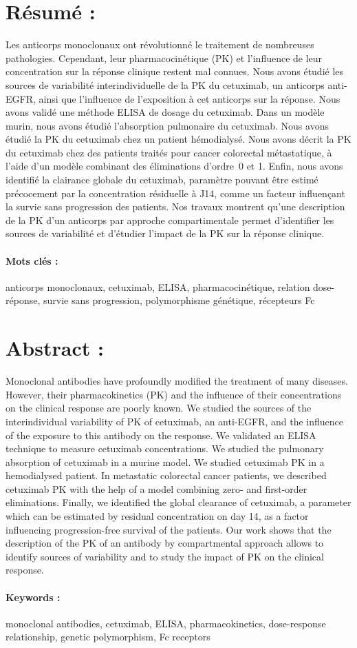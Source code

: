 \begin{minipage}{16cm}
\section*{Résumé :}
Les anticorps monoclonaux ont révolutionné le traitement de nombreuses pathologies. Cependant, leur pharmacocinétique (PK) et l'influence de leur concentration sur la réponse clinique restent mal connues. Nous avons étudié les sources de variabilité interindividuelle de la PK du cetuximab, un anticorps anti-EGFR, ainsi que l'influence de l'exposition à cet anticorps sur la réponse. Nous avons validé une méthode ELISA de dosage du cetuximab. Dans un modèle murin, nous avons étudié l'absorption pulmonaire du cetuximab. Nous avons étudié la PK du cetuximab chez un patient hémodialysé. Nous avons décrit la PK du cetuximab chez des patients traités pour cancer colorectal métastatique, à l'aide d'un modèle combinant des éliminations d'ordre~0 et 1. Enfin, nous avons identifié la clairance globale du cetuximab, paramètre pouvant être estimé précocement par la concentration résiduelle à J14, comme un facteur influençant la survie sans progression des patients. Nos travaux montrent qu'une description de la PK d'un anticorps par approche compartimentale permet d'identifier les sources de variabilité et d'étudier l'impact de la PK sur la réponse clinique.
\paragraph*{Mots clés :} anticorps monoclonaux, cetuximab, ELISA, pharmacocinétique, relation dose-réponse, survie sans progression, polymorphisme génétique, récepteurs Fc
\vspace{1cm}
\section*{Abstract :}
Monoclonal antibodies have profoundly modified the treatment of many diseases. However, their pharmacokinetics (PK) and the influence of their concentrations on the clinical response are poorly known. We studied the sources of the interindividual variability of PK of cetuximab, an anti-EGFR, and the influence of the exposure to this antibody on the response. We validated an ELISA technique to measure cetuximab concentrations. We studied the pulmonary absorption of cetuximab in a murine model. We studied cetuximab PK in a hemodialysed patient. In metastatic colorectal cancer patients, we described cetuximab PK with the help of a model combining zero- and first-order eliminations. Finally, we identified the global clearance of cetuximab, a parameter which can be estimated by residual concentration on day 14, as a factor influencing progression-free survival of the patients. Our work shows that the description of the PK of an antibody by compartmental approach allows to identify sources of variability and to study the impact of PK on the clinical response.
\paragraph*{Keywords :} monoclonal antibodies, cetuximab, ELISA, pharmacokinetics, dose-response relationship, genetic polymorphism, Fc receptors
\end{minipage}